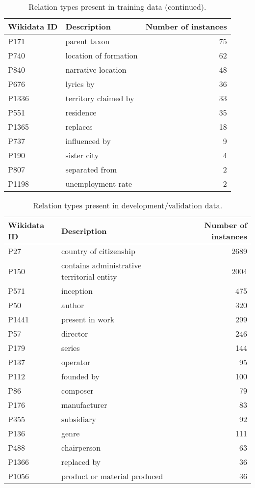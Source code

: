 \documentclass[11pt]{article}
\begin{document}
\begin{table*}
\centering
\begin{tabular}{llr}
\hline
Wikidata ID & Description & Number of instances\\
\hline
P171 & parent taxon & 75\\
P740 & location of formation & 62\\
P840 & narrative location & 48\\
P676 & lyrics by & 36\\
P1336 & territory claimed by & 33\\
P551 & residence & 35\\
P1365 & replaces & 18\\
P737 & influenced by & 9\\
P190 & sister city & 4\\
P807 & separated from & 2\\
P1198 & unemployment rate & 2\\

\hline
\end{tabular}
\caption{\label{tab:train-types2} Relation types present in training data (continued).}
\end{table*}




\begin{table*}
\centering
\begin{tabular}{llr}
\hline
Wikidata ID & Description & Number of instances\\
\hline
P27 & country of citizenship & 2689\\
P150 & contains administrative territorial entity & 2004\\
P571 & inception & 475\\
P50 & author & 320\\
P1441 & present in work & 299\\
P57 & director & 246\\
P179 & series & 144\\
P137 & operator & 95\\
P112 & founded by & 100\\
P86 & composer & 79\\
P176 & manufacturer & 83\\
P355 & subsidiary & 92\\
P136 & genre & 111\\
P488 & chairperson & 63\\
P1366 & replaced by & 36\\
P1056 & product or material produced & 36\\
\hline
\end{tabular}
\caption{\label{tab:dev-types} Relation types present in development/validation data.}
\end{table*}
\end{document}
